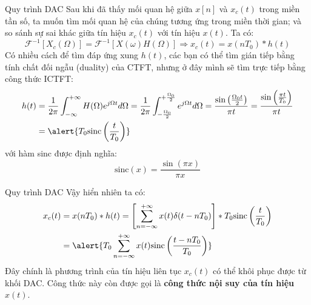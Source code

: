\documentclass[8pt]{beamer}
\begin{document}
\begin{frame}{Quy trình DAC}
Sau khi đã thấy mối quan hệ giữa $x[n]$ và $x_{c}(t)$ trong miền tần số, ta muốn tìm mối quan hệ của chúng tương ứng trong miền thời gian; và so sánh sự sai khác giữa tín hiệu $x_{c}(t)$ với tín hiệu $x(t)$.
Ta có:
$$\mathscr{F}^{-1}[X_{c}(\Omega)]=\mathscr{F}^{-1}[X(\omega)H(\Omega)]\Rightarrow x_{c}(t)=x(nT_{0})*h(t)$$
Có nhiều cách để tìm đáp ứng xung $h(t)$, các bạn có thể tìm gián tiếp bằng tính chất đối ngẫu (duality) của CTFT, nhưng ở đây mình sẽ tìm trực tiếp bằng công thức ICTFT:
\begin{equation*}
\begin{split}
	h(t)&=\frac{1}{2\pi}\int_{-\infty}^{+\infty}H(\Omega)e^{j\Omega t}d\Omega=\frac{1}{2\pi}\int_{-\frac{\Omega_{0}}{2}}^{+\frac{\Omega_{0}}{2}}e^{j\Omega t}d\Omega=\frac{\sin\left(\frac{\Omega_{0}t}{2}\right)}{\pi t}=\frac{\sin\left(\frac{\pi t}{T_{0}}\right)}{\pi t}\\
		 &= \alert{T_{0}\text{sinc}\left(\frac{t}{T_{0}}\right)}
\end{split}
\end{equation*}
với hàm sinc được định nghĩa: $$\text{sinc}(x)=\frac{\sin(\pi x)}{\pi x}$$ 
\end{frame}
\begin{frame}{Quy trình DAC}
Vậy hiển nhiên ta có:
\begin{equation*}
\begin{split}
	x_{c}(t)&=x(nT_{0})*h(t)=\left[\sum_{n=-\infty}^{+\infty}x(t)\delta(t-nT_{0})\right]*T_{0}\text{sinc}\left(\frac{t}{T_{0}}\right)\\ &=\alert{T_{0}\sum_{n=-\infty}^{+\infty}x(t)\text{sinc}\left(\frac{t-nT_{0}}{T_{0}}\right)}
\end{split}
\end{equation*}
Đây chính là phương trình của tín hiệu liên tục $x_{c}(t)$ có thể khôi phục được từ khối DAC.
Công thức này còn được gọi là \textbf{công thức nội suy của tín hiệu $x(t)$}.
\end{frame}
\end{document}

